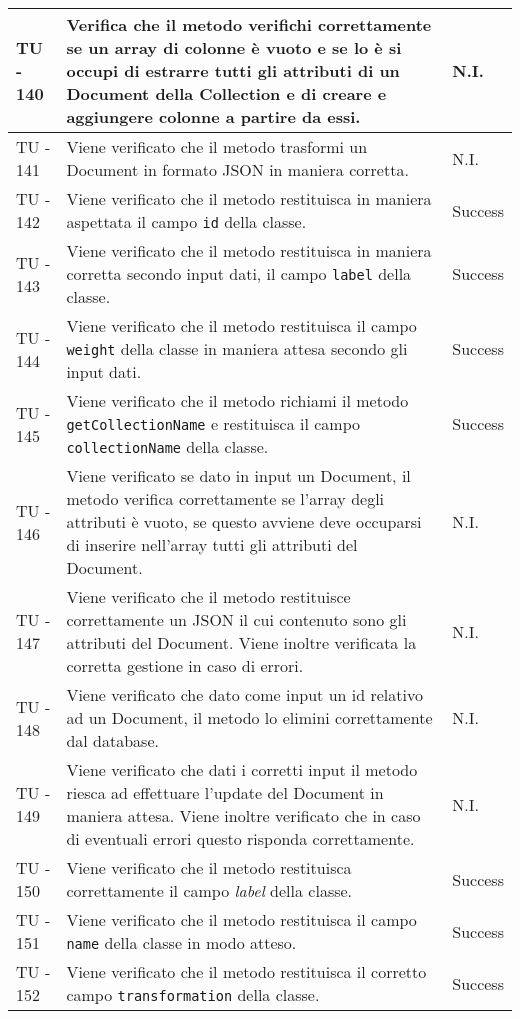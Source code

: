 \begin{center}
\begin{longtable}{ | p{3cm} | p{9cm} | p{2cm} | }
TU - 140 & Verifica che il metodo verifichi correttamente se un array di colonne è vuoto e se lo è si occupi di estrarre tutti gli attributi di un Document della Collection e di creare e aggiungere colonne a partire da essi. 
 & N.I. \\ \hline
TU - 141 & Viene verificato che il metodo trasformi un Document in formato JSON in maniera corretta. & N.I. \\ \hline
TU - 142 & Viene verificato che il metodo restituisca in maniera aspettata il campo \texttt{id} della classe. & Success \\ \hline
TU - 143 & Viene verificato che il metodo restituisca in maniera corretta secondo input dati, il campo \texttt{label} della classe. & Success \\ \hline
TU - 144 & Viene verificato che il metodo restituisca il campo \texttt{weight} della classe in maniera attesa secondo gli input dati. & Success \\ \hline
TU - 145 & Viene verificato che il metodo richiami il metodo  \texttt{getCollectionName} e restituisca il campo \texttt{collectionName} della classe. & Success \\ \hline
TU - 146 & Viene verificato se dato in input un Document, il metodo verifica correttamente se l'array degli attributi è vuoto, se questo avviene deve occuparsi di inserire nell'array tutti gli attributi del Document.
 & N.I. \\ \hline
TU - 147 & Viene verificato che il metodo restituisce correttamente un JSON il cui contenuto sono gli attributi del Document.
Viene inoltre verificata la corretta gestione in caso di errori.  & N.I. \\ \hline
TU - 148 & Viene verificato che dato come input un id relativo ad un Document, il metodo lo elimini correttamente dal database. & N.I. \\ \hline
TU - 149 & Viene verificato che dati i corretti input il metodo riesca ad effettuare l'update del Document in maniera attesa. Viene inoltre verificato che in caso di eventuali errori questo risponda correttamente. & N.I. \\ \hline
TU - 150 & Viene verificato che il metodo restituisca correttamente il campo \textit{label} della classe. & Success \\ \hline
TU - 151 & Viene verificato che il metodo restituisca il campo \texttt{name} della classe in modo atteso. & Success \\ \hline
TU - 152 & Viene verificato che il metodo restituisca il corretto campo \texttt{transformation} della classe. & Success \\ \hline

\end{longtable}
\end{center}
